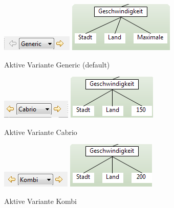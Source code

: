 \begin{figure}[h!]
  \begin{center}
    \includegraphics{4_2_Change_Var_Generic.png}
    \includegraphics[scale=0.8]{4_2_Change_Var_Generic_Tree.png}
  		  \caption{Aktive Variante Generic (default)}
     \label{ttn.depencyRulesEdit}
  \end{center}
\end{figure}

\begin{figure}[h!]
  \begin{center}
    \includegraphics{4_2_Change_Var_Cabrio.png}
    \includegraphics[scale=0.9]{4_2_Change_Var_Cabrio_Tree.png}
  		  \caption{Aktive Variante Cabrio}
     \label{ttn.depencyRulesEdit}
  \end{center}
\end{figure}

\begin{figure}[h!]
  \begin{center}
    \includegraphics{4_2_Change_Var_Kombi.png}
    \includegraphics[scale=0.9]{4_2_Change_Var_Kombi_Tree.png}
  		  \caption{Aktive Variante Kombi}
     \label{ttn.depencyRulesEdit}
  \end{center}
\end{figure}

